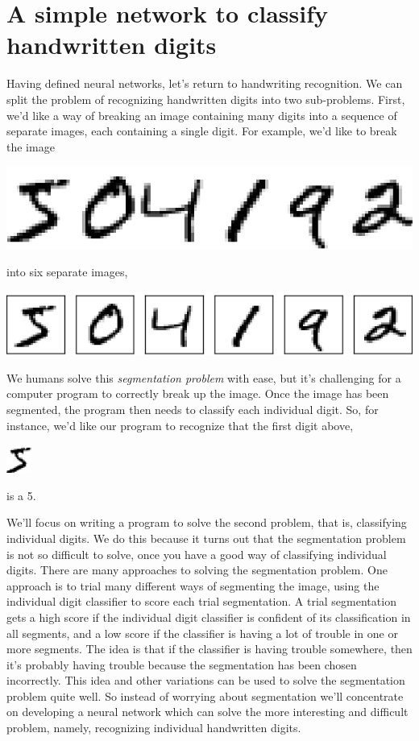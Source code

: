 \documentclass[a4paper,twoside,10pt]{book}
\begin{document}
\section{A simple network to classify handwritten digits}
Having defined neural networks, let's return to handwriting recognition. We can split the problem of recognizing handwritten digits into two sub-problems. First, we'd like a way of breaking an image containing many digits into a sequence of separate images, each containing a single digit. For example, we'd like to break the image
\begin{center}
	\includegraphics[scale=0.35]{./figures/ch1/digits}
\end{center}
into six separate images,
\begin{center}
	\includegraphics[scale=0.5]{./figures/ch1/digits_separate}
\end{center}
We humans solve this \textit{segmentation problem} with ease, but it's challenging for a computer program to correctly break up the image. Once the image has been segmented, the program then needs to classify each individual digit. So, for instance, we'd like our program to recognize that the first digit above,
\begin{center}
	\includegraphics[scale=0.65]{./figures/ch1/mnist_first_digit}
\end{center}
is a 5.

We'll focus on writing a program to solve the second problem, that is, classifying individual digits. We do this because it turns out that the segmentation problem is not so difficult to solve, once you have a good way of classifying individual digits. There are many approaches to solving the segmentation problem. One approach is to trial many different ways of segmenting the image, using the individual digit classifier to score each trial segmentation. A trial segmentation gets a high score if the individual digit classifier is confident of its classification in all segments, and a low score if the classifier is having a lot of trouble in one or more segments. The idea is that if the classifier is having trouble somewhere, then it's probably having trouble because the segmentation has been chosen incorrectly. This idea and other variations can be used to solve the segmentation problem quite well. So instead of worrying about segmentation we'll concentrate on developing a neural network which can solve the more interesting and difficult problem, namely, recognizing individual handwritten digits.
\end{document}
